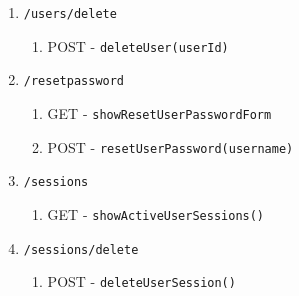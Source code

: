 \documentclass[12pt,DIV14,BCOR10mm,a4paper,twoside,parskip=half-,headsepline,headinclude,english,ngerman,bibliography=totocnumbered]{scrreprt}
\begin{document}
\begin{enumerate}
\begin{enumerate}
\begin{enumerate}
      \item \texttt{/users/delete}
      \begin{enumerate}
        \item POST - \texttt{deleteUser(userId)}
      \end{enumerate}
      \item \texttt{/resetpassword}
      \begin{enumerate}
        \item GET - \texttt{showResetUserPasswordForm}
        \item POST - \texttt{resetUserPassword(username)}
      \end{enumerate}
      \item \texttt{/sessions}
      \begin{enumerate}
        \item GET - \texttt{showActiveUserSessions()}
      \end{enumerate}
      \item \texttt{/sessions/delete}
      \begin{enumerate}
        \item POST - \texttt{deleteUserSession()}
      \end{enumerate}
    \end{enumerate}

   


\end{enumerate}
\end{enumerate}
\end{document}
